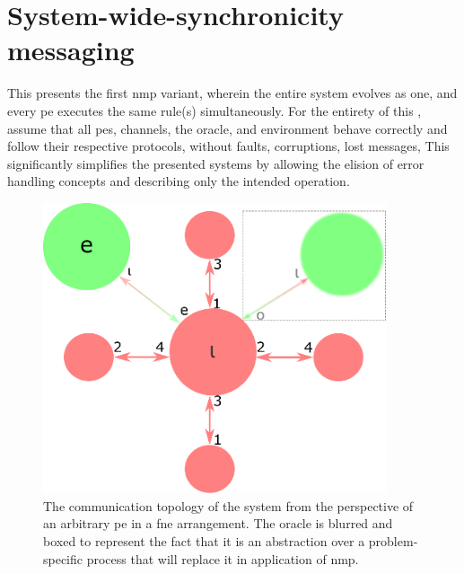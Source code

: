 \section{\label{sec:nmp:systemwide}System-wide-synchronicity messaging}

\cpresetrulenumber

This  presents the first \gls{nmp} variant, wherein the entire system evolves as one, and every \gls{pe} executes the same rule(s) simultaneously.  For the entirety of this , assume that all \glspl{pe}, channels, the oracle, and environment behave correctly and follow their respective protocols, without faults, corruptions, lost messages, \etc{}  This significantly simplifies the presented systems by allowing the elision of error handling concepts and describing only the intended operation.

\begin{figure}
    \centering
    \includegraphics[width=0.9\textwidth]{chapters/nmp/images/iota_proxels_environment_oracle_v6.pdf}
    \caption[The communication topology of a  system from the perspective of an arbitrary  in a \gls{fne} arrangement]{The communication topology of the system from the perspective of an arbitrary \gls{pe} in a \gls{fne} arrangement.  The oracle is blurred and boxed to represent the fact that it is an abstraction over a problem-specific process that will replace it in application of \gls{nmp}.}
    \label{fig:nmp:iota_proxels_environment_oracle}
\end{figure}

